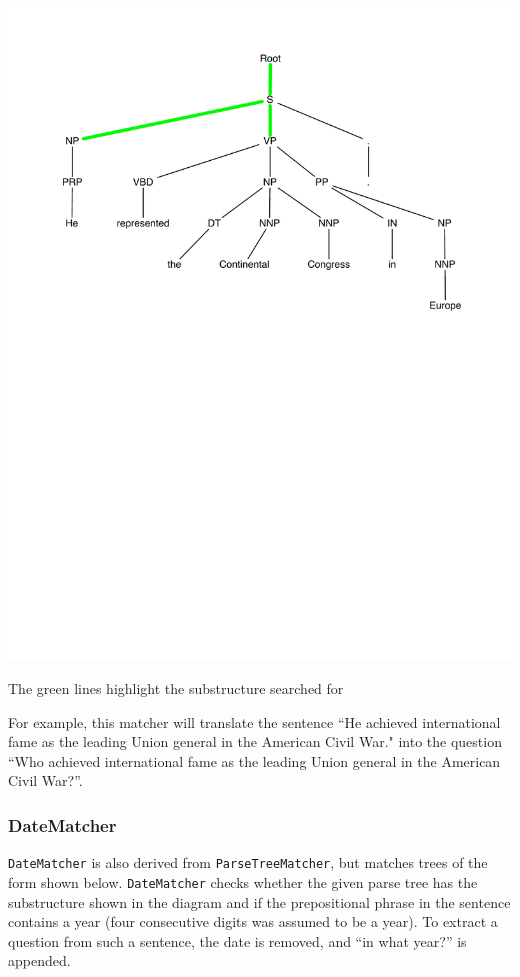 \documentclass[11pt]{article}
\begin{document}
\begin{center}
  \includegraphics[scale=0.5]{factoid_matcher}
  
  \textsf{The green lines highlight the substructure searched for}
\end{center}

For example, this matcher will translate the sentence ``He achieved
international fame as the leading Union general in the American Civil War." into
the question ``Who achieved international fame as the leading Union general in
the American Civil War?''.

\subsubsection{DateMatcher}

\texttt{DateMatcher} is also derived from \texttt{ParseTreeMatcher}, but matches
trees of the form shown below. \texttt{DateMatcher} checks whether the given
parse tree has the substructure shown in the diagram and if the prepositional
phrase in the sentence contains a year (four consecutive digits was assumed to
be a year). To extract a question from such a sentence, the date is removed, and
``in what year?'' is appended.
\end{document}
